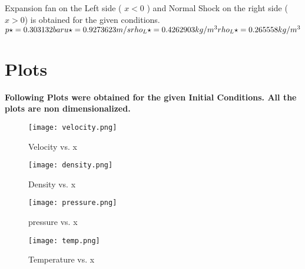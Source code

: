 \documentclass{article}
\begin{document}
Expansion fan on the Left side ( $x < 0$ ) and Normal Shock on the right side ($x>0$) is obtained for the given conditions. 
$p\star = 0.303132 bar
\\u\star =  0.9273623 m/s
\\
rho_L\star = 0.4262903 kg/m^3 
\\
rho_L\star = 0.265558 kg/m^3 $
\section*{Plots}
\textbf{Following Plots were obtained for the given Initial Conditions. All the plots are non dimensionalized.} 

\begin{figure}[H] \label{figure}
\texttt{[image: velocity.png]}
\label{figure:}
\caption{Velocity vs. x}
\end{figure}

\begin{figure}[H] \label{figure}
\texttt{[image: density.png]}
\label{figure:}
\caption{Density vs. x}
\end{figure}

\begin{figure}[H] \label{figure}
\texttt{[image: pressure.png]}
\label{figure:}
\caption{pressure vs. x}
\end{figure}

\begin{figure}[H] \label{figure}
\texttt{[image: temp.png]}
\label{figure:}
\caption{Temperature vs. x}
\end{figure}
\end{document}
